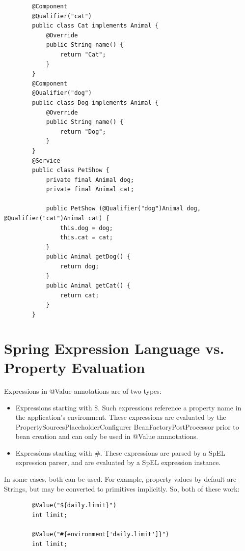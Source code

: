 \documentclass{scrartcl}
\begin{document}
    \begin{lstlisting}
        @Component
        @Qualifier("cat")
        public class Cat implements Animal {
            @Override
            public String name() {
                return "Cat";
            }
        }
        @Component
        @Qualifier("dog")
        public class Dog implements Animal {
            @Override
            public String name() {
                return "Dog";
            }
        }
        @Service
        public class PetShow {
            private final Animal dog;
            private final Animal cat;

            public PetShow (@Qualifier("dog")Animal dog, @Qualifier("cat")Animal cat) {
                this.dog = dog;
                this.cat = cat;
            }
            public Animal getDog() {
                return dog;
            }
            public Animal getCat() {
                return cat;
            }
        }
        \end{lstlisting}

\section{Spring Expression Language vs. Property Evaluation}

    Expressions in @Value annotations are of two types:

    \begin{itemize}
        \item Expressions starting with \$. Such expressions reference a property name in the application’s environment. These expressions are evaluated by the PropertySourcesPlaceholderConfigurer BeanFactoryPostProcessor prior to bean creation and can only be used in @Value annnotations.
        \item Expressions starting with \#.
        These expressions are parsed by a SpEL expression parser, and are evaluated by a SpEL expression instance.
    \end{itemize}

    In some cases, both can be used. For example, property values by default are Strings, but may be converted to primitives implicitly. So, both of these work:

    \begin{lstlisting}
        @Value("${daily.limit}")
        int limit;

        @Value("#{environment['daily.limit']}")
        int limit;
    \end{lstlisting}
\end{document}
